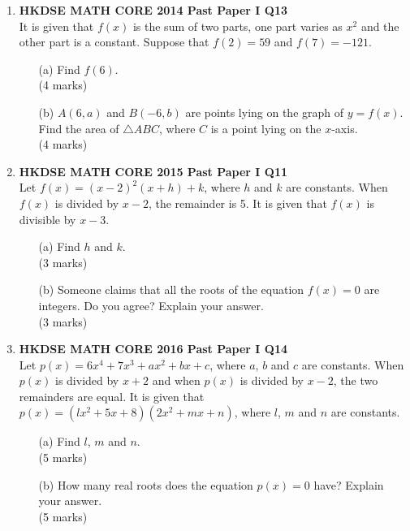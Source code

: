 \documentclass[12pt]{article}
\begin{document}
\begin{enumerate}
	\item \textbf{HKDSE MATH CORE 2014 Past Paper I Q13}\\
	It is given that $f(x)$ is the sum of two parts, one part varies as $x^2$ and the other part is a constant. Suppose that $f(2) = 59$ and $f(7) = -121$.
	\begin{enumerate}
		\item[(a)] Find $f(6)$. \\(4 marks)
		\item[(b)] $A(6, a)$ and $B(-6, b)$ are points lying on the graph of $y = f(x)$. Find the area of $\triangle ABC$, where $C$ is a point lying on the $x$-axis. \\(4 marks)
	\end{enumerate}
	\newpage

	\item \textbf{HKDSE MATH CORE 2015 Past Paper I Q11}\\
	Let $f(x) = (x - 2)^2(x+h)+k$, where $h$ and $k$ are constants. When  $f(x)$ is divided by $x - 2$, the remainder is 5. It is given that  $f(x)$ is divisible by $x - 3$.
	\begin{enumerate}
		\item[(a)] Find $h$ and $k$. \\(3 marks)
		\item[(b)] Someone claims that all the roots of the equation  $f(x) = 0$ are integers. Do you agree? Explain your answer. \\(3 marks)
	\end{enumerate}
	\newpage

	\item \textbf{HKDSE MATH CORE 2016 Past Paper I Q14}\\
	Let $p(x) = 6x^4 + 7x^3 + ax^2 + bx + c$, where $a$, $b$ and $c$ are constants. When $p(x)$ is divided by $x + 2$ and when $p(x)$ is divided by $x - 2$, the two remainders are equal. It is given that $p(x) = (lx^2 + 5x + 8)(2x^2 + mx + n)$, where $l$, $m$ and $n$ are constants.
	\begin{enumerate}
		\item[(a)] Find $l$, $m$ and $n$. \\(5 marks)
		\item[(b)] How many real roots does the equation $p(x) = 0$ have? Explain your answer. \\(5 marks)
	\end{enumerate}
	\newpage


\end{enumerate}
\end{document}
